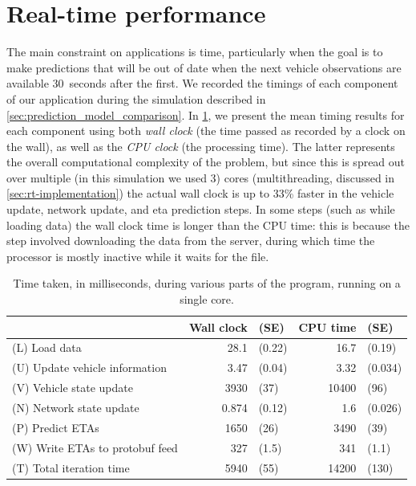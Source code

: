 \section{Real-time performance}
\label{sec:prediction_performance}

The main constraint on \rt{} applications is time, particularly when the goal is to make predictions that will be out of date when the next vehicle observations are available 30~seconds after the first. We recorded the timings of each component of our application during the simulation described in \cref{sec:prediction_model_comparison}. In \cref{tab:prediction_timing}, we present the mean timing results for each component using both \emph{wall clock} (the time passed as recorded by a clock on the wall), as well as the \emph{CPU clock} (the processing time). The latter represents the overall computational complexity of the problem, but since this is spread out over multiple (in this simulation we used 3) cores (multithreading, discussed in \cref{sec:rt-implementation}) the actual wall clock is up to 33\% faster in the vehicle update, network update, and \gls{eta} prediction steps. In some steps (such as while loading data) the wall clock time is longer than the CPU time: this is because the step involved downloading the data from the server, during which time the processor is mostly inactive while it waits for the file.



\begin{knitrout}\small
{}\color{fgcolor}\begin{table}

\caption{\label{tab:prediction_timing}Time taken, in milliseconds, during various parts of the program, running on a single core.}
\centering
\fontsize{8}{10}\selectfont
\begin{tabular}[t]{lrlrl}
\toprule
 & Wall clock & (SE) & CPU time & (SE)\\
\midrule
(L) Load data & 28.1 & (0.22) & 16.7 & (0.19)\\
(U) Update vehicle information & 3.47 & (0.04) & 3.32 & (0.034)\\
(V) Vehicle state update & 3930 & (37) & 10400 & (96)\\
(N) Network state update & 0.874 & (0.12) & 1.6 & (0.026)\\
(P) Predict ETAs & 1650 & (26) & 3490 & (39)\\
\addlinespace
(W) Write ETAs to protobuf feed & 327 & (1.5) & 341 & (1.1)\\
\midrule
(T) Total iteration time & 5940 & (55) & 14200 & (130)\\
\bottomrule
\end{tabular}
\end{table}


\end{knitrout}



